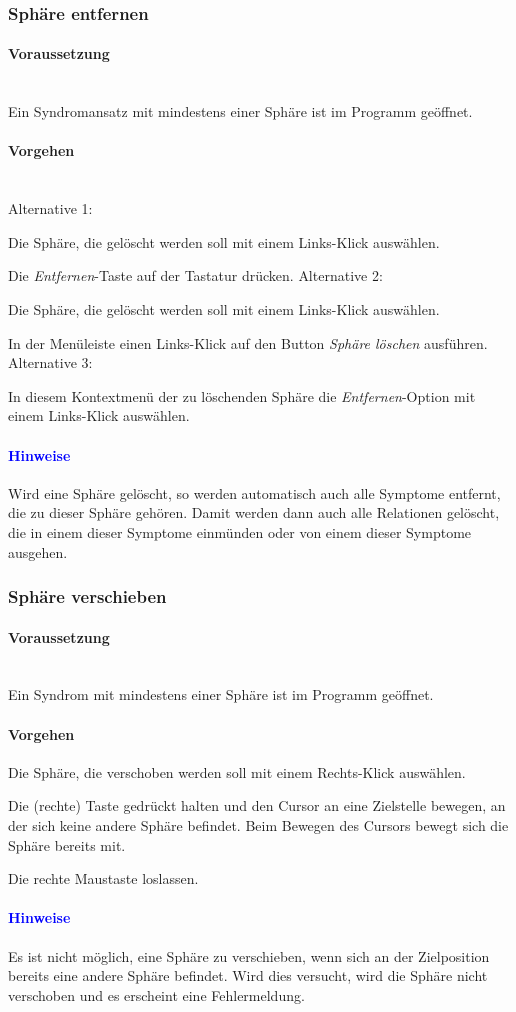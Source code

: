 \documentclass[enabledeprecatedfontcommands,fontsize=11pt,paper=a4,twoside]{scrartcl}
\newcounter{one}
\newcounter{two}[one]
\newcommand*{\hint}{\paragraph{\textcolor{blue}{Hinweise}}}
\newcommand*{\condition}{\paragraph{Voraussetzung}$\;$ \vspace{0.2cm}\\}
\newcommand*{\actions}{\paragraph{Vorgehen} $\;$\vspace{0.2cm}\\}
\newcommand*{\action}{\paragraph{Vorgehen}}
\newcommand*{\aOne}{\textcolor{bbe}{Alternative 1:}}
\newcommand*{\aTwo}{\textcolor{bbe}{Alternative 2:}}
\newcommand*{\aThree}{\textcolor{bbe}{Alternative 3:}}
\let\tempone\itemize
\let\temptwo\enditemize
\renewenvironment{itemize}{\tempone\addtolength{\itemsep}{-10.0pt}}{\temptwo}
\let\origenumerate\enumerate
\let\origendenumerate\endenumerate
\renewenvironment{enumerate}{\origenumerate \addtolength{\itemsep}{-10.0pt}}{\origendenumerate}
\begin{document}
\subsubsection{Sphäre entfernen}
			\condition 	
		Ein Syndromansatz mit mindestens einer Sphäre ist im Programm geöffnet. 
		\actions  
		\aOne
		\begin{enumerate}
			\item Die Sphäre, die gelöscht werden soll mit einem Links-Klick auswählen.
			\item Die \textit{Entfernen}-Taste auf der Tastatur drücken.
		\end{enumerate}
	\newpage
		\hspace{-0.4cm}\aTwo
			\begin{enumerate}
			\item Die Sphäre, die gelöscht werden soll mit einem Links-Klick auswählen.
			\item In der Menüleiste einen Links-Klick auf den Button \textit{Sphäre löschen} ausführen.
		\end{enumerate}
		\aThree
		\begin{enumerate} 
			\item In diesem Kontextmenü der zu löschenden Sphäre die \textit{Entfernen}-Option mit einem Links-Klick auswählen.
		\end{enumerate}
		\hint
		\begin{itemize}
			\item Wird eine Sphäre gelöscht, so werden automatisch auch alle Symptome entfernt, die zu dieser Sphäre gehören. Damit werden dann auch alle Relationen gelöscht, die in einem dieser Symptome einmünden oder von einem dieser Symptome ausgehen.\\
		\end{itemize}
			
\subsubsection{Sphäre verschieben}
		\condition 	
		Ein Syndrom mit mindestens einer Sphäre ist im Programm geöffnet. 
		\action  
		\begin{enumerate}
			\item Die Sphäre, die verschoben werden soll mit einem Rechts-Klick auswählen.
			\item Die (rechte) Taste gedrückt halten und den Cursor an eine Zielstelle bewegen, an der sich keine andere Sphäre befindet. Beim Bewegen des Cursors bewegt sich die Sphäre bereits mit. 
			\item Die rechte Maustaste loslassen.
		\end{enumerate}
		\hint
		\begin{itemize}
			\item Es ist nicht möglich, eine Sphäre zu verschieben, wenn sich an der Zielposition bereits eine andere Sphäre befindet. Wird dies versucht, wird die Sphäre nicht verschoben und es erscheint eine Fehlermeldung.\\
		\end{itemize}
			
\end{document}
